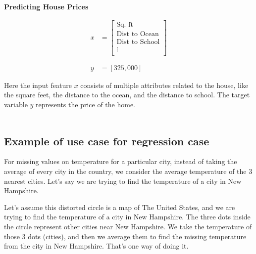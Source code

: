\begin{center}
    \textbf{Predicting House Prices}
\end{center}

\vspace{-0.5cm}

\begin{align*}
    x &= \begin{bmatrix}
            \text{Sq. ft} \\
            \text{Dist to Ocean} \\
            \text{Dist to School} \\
            \vdots \\
         \end{bmatrix} \\\\\\
    y &= [325,000]
\end{align*}

Here the input feature $x$ consists of multiple attributes related to the house,
like the  square feet, the distance to the ocean, and the distance to school. The target
variable $y$ represents the price of the home.\\\\

\subsection{Example of use case for regression case}

For missing values on temperature for a particular city, instead of
taking the average of every city in the country, we consider the average
temperature of the 3 nearest cities. Let's say we are trying to find the temperature
of a city in New Hampshire.

\begin{center}
\end{center}

Let's assume this distorted circle is a map of The United States, and we are trying
to find the temperature of a city in New Hampshire. The three dots inside the circle
represent other cities near New Hampshire. We take the temperature of those 3 dots (cities),
and then we average them to find the missing temperature from the city in New Hampshire. That's one
way of doing it.

